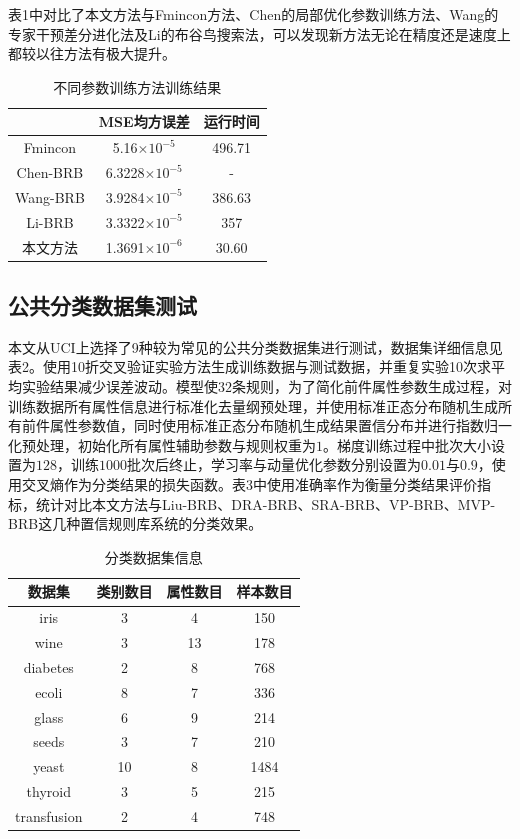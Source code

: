 \documentclass{cjc}
\begin{document}
表1中对比了本文方法与Fmincon方法、Chen的局部优化参数训练方法、Wang的专家干预差分进化法及Li的布谷鸟搜索法，可以发现新方法无论在精度还是速度上都较以往方法有极大提升。
\begin{table}
	\centering
	\caption{不同参数训练方法训练结果}
	\small
	\begin{tabular}{ccc}
		\toprule
	 	& MSE均方误差 & 运行时间  \\
		\midrule
		Fmincon & 5.16$\times 10^{-5}$ & 496.71\\
		Chen-BRB & 6.3228$\times 10^{-5}$ & -\\
		Wang-BRB & 3.9284$\times 10^{-5}$ & 386.63\\
		Li-BRB & 3.3322$\times 10^{-5}$ & 357\\
		本文方法 & 1.3691$\times 10^{-6}$ & 30.60\\
		\bottomrule
	\end{tabular}
\end{table}

\subsection{公共分类数据集测试}
本文从UCI上选择了9种较为常见的公共分类数据集进行测试，数据集详细信息见表2。使用10折交叉验证实验方法生成训练数据与测试数据，并重复实验10次求平均实验结果减少误差波动。模型使$32$条规则，为了简化前件属性参数生成过程，对训练数据所有属性信息进行标准化去量纲预处理，并使用标准正态分布随机生成所有前件属性参数值，同时使用标准正态分布随机生成结果置信分布并进行指数归一化预处理，初始化所有属性辅助参数与规则权重为$1$。梯度训练过程中批次大小设置为$128$，训练$1000$批次后终止，学习率与动量优化参数分别设置为$0.01$与$0.9$，使用交叉熵作为分类结果的损失函数。表3中使用准确率作为衡量分类结果评价指标，统计对比本文方法与Liu-BRB\cite{a15}、DRA-BRB\cite{a20}、SRA-BRB\cite{a21}、VP-BRB、MVP-BRB\cite{a22}这几种置信规则库系统的分类效果。
\begin{table}
	\centering
	\caption{分类数据集信息}
	\begin{tabular}{cccc}
		\toprule
		数据集 & 类别数目 & 属性数目 & 样本数目  \\
		\midrule
		iris & 3 & 4 & 150 \\
		wine & 3 & 13 & 178 \\
		diabetes & 2 & 8 & 768 \\
		ecoli & 8 & 7 & 336 \\
		glass & 6 & 9 & 214 \\
		seeds & 3 & 7 & 210 \\
		yeast & 10 & 8 & 1484 \\
		thyroid & 3 & 5 & 215 \\
		transfusion & 2 & 4 & 748 \\
		\bottomrule
	\end{tabular}
\end{table}
\end{document}

